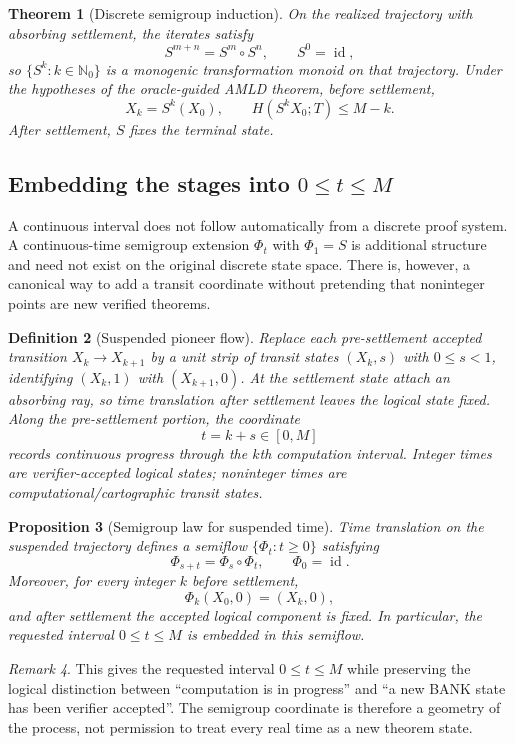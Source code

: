 \documentclass[11pt]{article}
\newtheorem{definition}{Definition}[section]
\newtheorem{theorem}[definition]{Theorem}
\newtheorem{proposition}[definition]{Proposition}
\theoremstyle{remark}
\newtheorem{remark}[definition]{Remark}
\newcommand{\id}{\operatorname{id}}
\begin{document}
\begin{theorem}[Discrete semigroup induction]
On the realized trajectory with absorbing settlement, the iterates satisfy
\[
S^{m+n}=S^m\circ S^n,\qquad S^0=\id,
\]
so $\{S^k:k\in\mathbb N_0\}$ is a monogenic transformation monoid on that trajectory. Under the hypotheses of the oracle-guided AMLD theorem, before settlement,
\[
X_k=S^k(X_0),\qquad H(S^kX_0;T)\le M-k.
\]
After settlement, $S$ fixes the terminal state.
\end{theorem}

\subsection{Embedding the stages into $0\le t\le M$}
A continuous interval does not follow automatically from a discrete proof system. A continuous-time semigroup extension $\Phi_t$ with $\Phi_1=S$ is additional structure and need not exist on the original discrete state space. There is, however, a canonical way to add a transit coordinate without pretending that noninteger points are new verified theorems.

\begin{definition}[Suspended pioneer flow]
Replace each pre-settlement accepted transition $X_k\to X_{k+1}$ by a unit strip of transit states $(X_k,s)$ with $0\le s<1$, identifying $(X_k,1)$ with $(X_{k+1},0)$. At the settlement state attach an absorbing ray, so time translation after settlement leaves the logical state fixed. Along the pre-settlement portion, the coordinate
\[
t=k+s\in[0,M]
\]
records continuous progress through the $k$th computation interval. Integer times are verifier-accepted logical states; noninteger times are computational/cartographic transit states.
\end{definition}

\begin{proposition}[Semigroup law for suspended time]
Time translation on the suspended trajectory defines a semiflow $\{\Phi_t:t\ge0\}$ satisfying
\[
\Phi_{s+t}=\Phi_s\circ\Phi_t,\qquad \Phi_0=\id.
\]
Moreover, for every integer $k$ before settlement,
\[
\Phi_k(X_0,0)=(X_k,0),
\]
and after settlement the accepted logical component is fixed. In particular, the requested interval $0\le t\le M$ is embedded in this semiflow.
\end{proposition}

\begin{remark}
This gives the requested interval $0\le t\le M$ while preserving the logical distinction between ``computation is in progress'' and ``a new BANK state has been verifier accepted''. The semigroup coordinate is therefore a geometry of the process, not permission to treat every real time as a new theorem state.
\end{remark}
\end{document}
